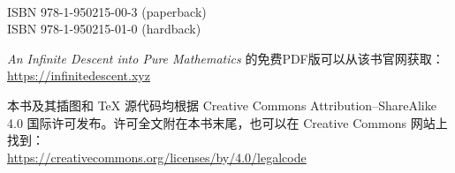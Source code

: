 {\small
~

\vfill

\thispagestyle{empty}


ISBN 978-1-950215-00-3 (paperback)\\
ISBN 978-1-950215-01-0 (hardback)

\begin{minipage}{0.75\textwidth}
\small
\textit{An Infinite Descent into Pure Mathematics} 的免费PDF版可以从该书官网获取：\\
\url{https://infinitedescent.xyz}
\end{minipage}

\begin{minipage}{0.75\textwidth}
\small
本书及其插图和 \TeX{} 源代码均根据 Creative Commons Attribution--ShareAlike 4.0 国际许可发布。许可全文附在本书末尾，也可以在 Creative Commons 网站上找到：\\
\url{https://creativecommons.org/licenses/by/4.0/legalcode}
\end{minipage}

}